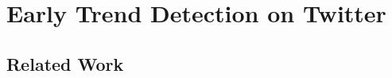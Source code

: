 
\chapter{Early Trend Detection on Twitter}
\label{cha:early-detection}

\section{Related Work}
\label{sec:related-work}